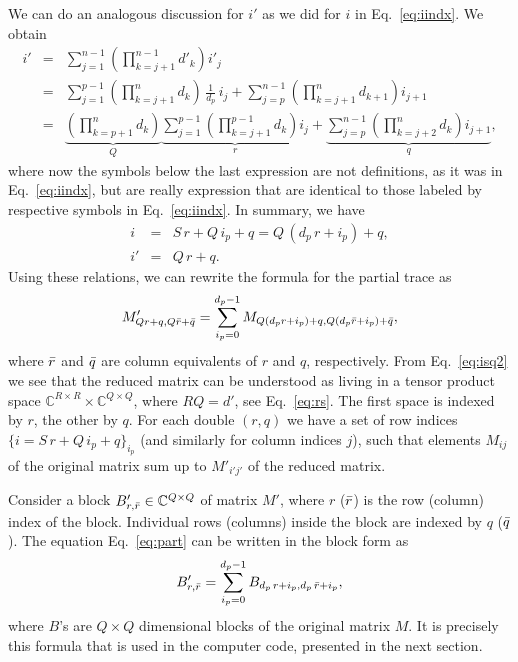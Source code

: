\documentclass[nofootinbib,superscriptaddress,longbibliography,a4paper,amsfonts]{revtex4-2}
\begin{document}
We can do an analogous discussion for $i'$ as we did for $i$ in Eq.~\eqref{eq:iindx}. We obtain
\begin{eqnarray}
i' & = & \sum_{j=1}^{n-1} \left( \prod_{k=j+1}^{n-1} d'_k \right) i'_j \\
& = & \sum_{j=1}^{p-1} \left( \prod_{k=j+1}^n d_k \right) \, \frac{1}{d_p} \, i_j + \sum_{j=p}^{n-1} \left( \prod_{k=j+1}^n d_{k+1} \right) i_{j+1} \\
& = & \underbrace{\left( \prod_{k=p+1}^n d_k \right)}_{Q} \underbrace{\sum_{j=1}^{p-1} \left( \prod_{k=j+1}^{p-1} d_k \right) i_j}_{r} + \underbrace{\sum_{j=p}^{n-1} \left( \prod_{k=j+2}^n d_k \right) i_{j+1}}_{q}, \label{eq:iindxPrime}
\end{eqnarray}
where now the symbols below the last expression are not definitions, as it was in Eq.~\eqref{eq:iindx}, but are really expression that are identical to those labeled by respective symbols in Eq.~\eqref{eq:iindx}. In summary, we have
\begin{eqnarray}
i & = & S \, r + Q \, i_p + q = Q \, (d_p \, r + i_p) + q, \label{eq:isq1} \\
i' & = & Q \, r + q. \label{eq:isq2}
\end{eqnarray}
Using these relations, we can rewrite the formula for the partial trace as
\begin{eqnarray}
M'_{Q r+q,Q \Bar{r} + \Bar{q}} = \sum_{i_p = 0}^{d_p - 1} M_{Q (d_p r + i_p) + q, Q (d_p \Bar{r} + i_p) + \Bar{q}},
\label{eq:part}
\end{eqnarray}
where $\Bar{r}$ and $\Bar{q}$ are column equivalents of $r$ and $q$, respectively. From Eq.~\eqref{eq:isq2} we see that the reduced matrix can be understood as living in a tensor product space $\mathbb{C}^{R \times R} \times \mathbb{C}^{Q \times Q}$, where $R Q = d'$, see Eq.~\eqref{eq:rs}. The first space is indexed by $r$, the other by $q$. For each double $(r,q)$ we have a set of row indices $\{ i = S \, r + Q \, i_p + q \}_{i_p}$ (and similarly for column indices $j$), such that elements $M_{ij}$ of the original matrix sum up to $M'_{i'j'}$ of the reduced matrix.

Consider a block $B'_{r,\Bar{r}} \in \mathbb{C}^{Q \times Q}$ of matrix $M'$, where $r$ ($\Bar{r}$) is the row (column) index of the block. Individual rows (columns) inside the block are indexed by $q$ ($\Bar{q}$). The equation Eq.~\eqref{eq:part} can be written in the block form as
\begin{eqnarray}
B'_{r, \Bar{r}} = \sum_{i_p = 0}^{d_p - 1} B_{d_p \, r + i_p, d_p \, \Bar{r} + i_p},
\end{eqnarray}
where $B$'s are $Q \times Q$ dimensional blocks of the original matrix $M$. It is precisely this formula that is used in the computer code, presented in the next section.
\end{document}

